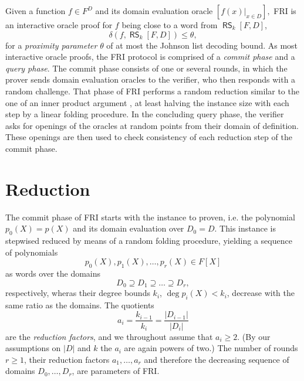 \documentclass[11pt,article,oneside]{memoir}
\theoremstyle{definition}
\theoremstyle{remark}
\DeclareMathOperator{\RS}{\mathsf{RS}}
\begin{document}
Given a function $f\in F^D$ and its  domain evaluation oracle 
$
[f(x)|_{x\in D}],
$ 
FRI is an interactive oracle proof for $f$ being close to a word from $\RS_k[F,D]$, 
\[
\delta( f, \RS_k[F,D]) \leq \theta,
\]
for a \textit{proximity parameter} $\theta$ of at most the Johnson list decoding bound. %
%
As most interactive oracle proofs, the FRI protocol is comprised of a \textit{commit phase} and a \textit{query phase}.
The commit phase consists of one or several rounds, in which the prover sends domain evaluation oracles to the verifier, who then responds with a random challenge.
That phase of FRI performs a random reduction similar to the one of an inner product argument \cite{BootleGroth}, at least halving the instance size with each step by a linear folding procedure.
In the concluding query phase, the verifier asks for openings of the oracles at random points from their domain of definition. 
These openings are then used to check consistency of each reduction step of the commit phase.


\section{Reduction}


The commit phase of FRI starts with the instance to proven, i.e. the polynomial $p_0(X)=p(X)$ and its domain evaluation over $D_0=D$.
This instance is stepwised reduced by means of a random folding procedure, yielding a sequence of polynomials 
\[
p_0(X), p_1(X), \ldots , p_r(X)\in  F[X]
\]
as words over the domains 
\[
D_0\supseteq D_1\supseteq \ldots\supseteq D_r,
\]
respectively, wheras their degree bounds $k_i$, $\deg p_i(X) < k_i$, decrease with the same ratio as the domains.
The quotients 
\[
a_i = \frac{k_{i-1}}{k_i} = \frac{|D_{i-1}|}{|D_i|} 
\]
are the \textit{reduction factors}, and we throughout assume that $a_i\geq 2$. (By our assumptions on $|D|$ and $k$ the $a_i$ are again powers of two.)
The number of rounds $r\geq 1$,  their reduction factors $a_1,\ldots, a_r$ and therefore the decreasing sequence of domains $D_0,\ldots, D_r$, are parameters of FRI.
\end{document}
